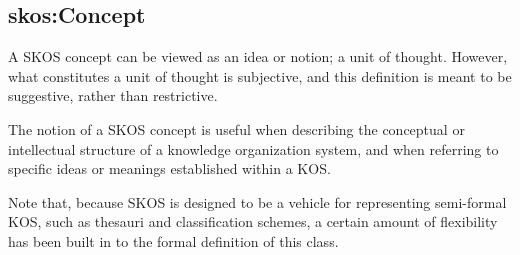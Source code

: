 \subsection{skos:Concept}

A SKOS concept can be viewed as an idea or notion; a unit of thought.
However, what constitutes a unit of thought is subjective, and this
definition is meant to be suggestive, rather than restrictive.

The notion of a SKOS concept is useful when describing the conceptual or
intellectual structure of a knowledge organization system, and when
referring to specific ideas or meanings established within a KOS.

Note that, because SKOS is designed to be a vehicle for representing
semi-formal KOS, such as thesauri and classification schemes, a certain
amount of flexibility has been built in to the formal definition of this
class.

